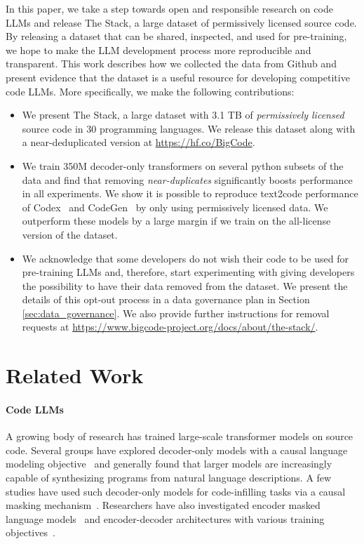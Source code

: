 In this paper, we take a step towards open and responsible research on code LLMs and release The Stack, a large dataset of permissively licensed source code. By releasing a dataset that can be shared, inspected, and used for pre-training, we hope to make the LLM development process more reproducible and transparent. This work describes how we collected the data from Github and present evidence that the dataset is a useful resource for developing competitive code LLMs. More specifically, we make the following contributions:

\begin{itemize}
    \item We present The Stack, a large dataset with 3.1 TB of \emph{permissively licensed} source code in 30 programming languages. We release this dataset along with a near-deduplicated version at \url{https://hf.co/BigCode}. 
    \item We train 350M decoder-only transformers on several python subsets of the data and find that removing \emph{near-duplicates} significantly boosts performance in all experiments. We show it is possible to reproduce text2code performance of Codex~\citep{chen2021codex} and CodeGen~\citep{Nijkamp2022ACP} by only using permissively licensed data. We outperform these models by a large margin if we train on the all-license version of the dataset. 
    \item We acknowledge that some developers do not wish their code to be used for pre-training LLMs and, therefore, start experimenting with giving developers the possibility to have their data removed from the dataset. We present the details of this opt-out process in a data governance plan in Section \ref{sec:data_governance}. We also provide further instructions for removal requests at \url{https://www.bigcode-project.org/docs/about/the-stack/}. 
\end{itemize}

\section{Related Work}

\paragraph{Code LLMs} A growing body of research has trained large-scale transformer models on source code. Several groups have explored decoder-only models with a causal language modeling objective~\citep{chen2021codex,austin2021program,Nijkamp2022ACP,christopolou2022pangucoder,izadi2022codefill,xu2022systematicevaluation} and generally found that larger models are increasingly capable of synthesizing programs from natural language descriptions. A few studies have used such decoder-only models for code-infilling tasks via a causal masking mechanism~\citep{fried2022incoder,bavarian2022fim}. Researchers have also investigated encoder masked language models~\citep{feng-etal-2020-codebert,kanade2020embeddings} and encoder-decoder architectures with various training objectives~\citep{li2022competition,ahmad-etal-2021-unified,wang-etal-2021-codet5,roziere2021dobf}.  

